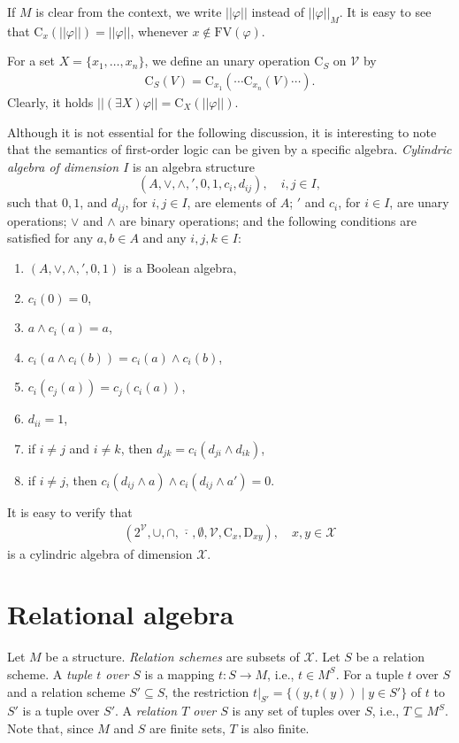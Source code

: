 \documentclass{lmcs}
\def\tu#1{( #1)}
\def\C{\textrm{C}}
\def\D{\textrm{D}}
\def\X{\mathcal X}
\def\V{\mathcal V}
\def\FV{\textrm{FV}}
\newcommand{\st}{%
	\ensuremath{\;|\;}
}
\begin{document}
If $M$ is clear from the context, we write $||\varphi||$ instead of $||\varphi||_M$. It is easy to see that $\C_x(||\varphi||)=||\varphi||$, whenever $x\notin\FV(\varphi)$.

For a set $X=\{x_1,\ldots, x_n\}$, we define an unary operation $\C_S$ on $\V$ by
\begin{align}
\C_S(V)=\C_{x_1}(\cdots \C_{x_n}(V)\cdots). 
\end{align}
Clearly, it holds $||(\exists X)\varphi||=\C_X(||\varphi||)$.





Although it is not essential for the following discussion, it is interesting to note that the semantics of first-order logic can be given by a specific algebra. \emph{Cylindric algebra of dimension $I$} is an algebra structure
 $$\tu{A,\vee,\wedge,',0,1,c_i,d_{ij}}, \quad i,j\in I,$$
 such that $0,1$, and $d_{ij}$, for $i,j\in I$, are elements of $A$; $'$ and $c_i$, for $i\in I$, are unary operations; $\vee$  and $\wedge$ are binary operations; and the following conditions are satisfied for any $a,b\in A$ and any $i,j,k\in I$: 
\begin{enumerate}
 \item $\tu{A,\vee,\wedge,',0, 1}$ is a Boolean algebra,
 \item $c_i(0)=0$,
 \item $a\wedge c_i(a)=a$,
 \item $c_i(a\wedge c_i(b))=c_i(a)\wedge c_i(b)$,
 \item $c_i(c_j(a))=c_j(c_i(a))$,
 \item $d_{ii}=1$,
 \item if $i\neq j$ and $i\neq k$, then $d_{jk}=c_i(d_{ji}\wedge d_{ik})$,
 \item if $i\neq j$, then $c_i(d_{ij}\wedge a)\wedge c_i(d_{ij}\wedge a')=0$.
\end{enumerate}
It is easy to verify that 
\begin{align}
\tu{2^{\V},\cup,\cap,\overline{\,\cdot\,},\emptyset,\V,\C_x,\D_{xy}}, \quad x,y\in \X 
\end{align}
is a cylindric algebra of dimension $\X$.

\section{Relational algebra}
Let $M$ be a structure. \emph{Relation schemes} are subsets of $\X$. Let $S$ be a relation scheme. A \emph{tuple $t$ over $S$} is a mapping $t\!:S\to M$, i.e., $t\in M^S$. For a tuple $t$ over $S$ and a relation scheme $S'\subseteq S$, the restriction $t|_{S'}=\{\tu{y,t(y)}\st y\in S'\}$ of $t$ to $S'$ is a tuple over $S'$. A \emph{relation $T$ over $S$} is any set of tuples over $S$, i.e., $T\subseteq M^S$. Note that, since $M$ and $S$ are finite sets, $T$ is also finite. 
\end{document}
